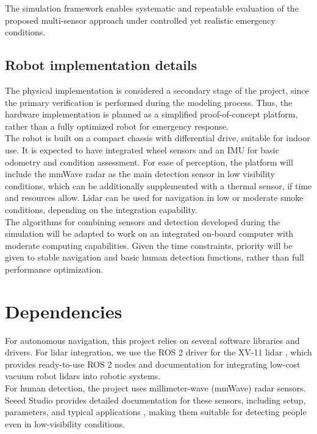 \documentclass[conference]{IEEEtran}
\begin{document}
The simulation framework enables systematic and repeatable evaluation of the proposed multi-sensor approach under controlled yet realistic emergency conditions.\\

\subsection*{Robot implementation details}
The physical implementation is considered a secondary stage of the project, since the primary verification is performed during the modeling process. Thus, the hardware implementation is planned as a simplified proof-of-concept platform, rather than a fully optimized robot for emergency response.\\

The robot is built on a compact chassis with differential drive, suitable for indoor use. It is expected to have integrated wheel sensors and an IMU for basic odometry and condition assessment. For ease of perception, the platform will include the mmWave radar as the main detection sensor in low visibility conditions, which can be additionally supplemented with a thermal sensor, if time and resources allow. Lidar can be used for navigation in low or moderate smoke conditions, depending on the integration capability.\\

The algorithms for combining sensors and detection developed during the simulation will be adapted to work on an integrated on-board computer with moderate computing capabilities. Given the time constraints, priority will be given to stable navigation and basic human detection functions, rather than full performance optimization.\\

\section*{Dependencies}

For autonomous navigation, this project relies on several software libraries and drivers. For lidar integration, we use the ROS 2 driver for the XV-11 lidar \cite{xv11_driver}, which provides ready-to-use ROS 2 nodes and documentation for integrating low-cost vacuum robot lidars into robotic systems.\\

For human detection, the project uses millimeter‑wave (mmWave) radar sensors. Seeed Studio provides detailed documentation for these sensors, including setup, parameters, and typical applications \cite{seeed_mmwave_intro}, making them suitable for detecting people even in low-visibility conditions.\\
\end{document}
